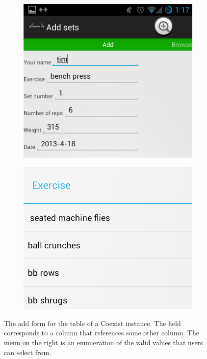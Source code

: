 \begin{figure}[h!]
    \centering
    \begin{subfigure}[3a]{0.25\textwidth}
        \includegraphics[width=.9\textwidth]{images/ss/form.png}
        \label{fig:gull}
    \end{subfigure}%
    \begin{subfigure}[3a]{0.25\textwidth}
        \includegraphics[width=.9\textwidth]{images/ss/fk.png}
        \label{fig:tiger}
    \end{subfigure}
    \caption{The add form for the  table of a Coexist instance.
    The  field corresponds to a column that references some other
    column. The menu on the right is an enumeration of the valid values that
  users can select from.}
    \label{fig:add_screen}
\end{figure}

